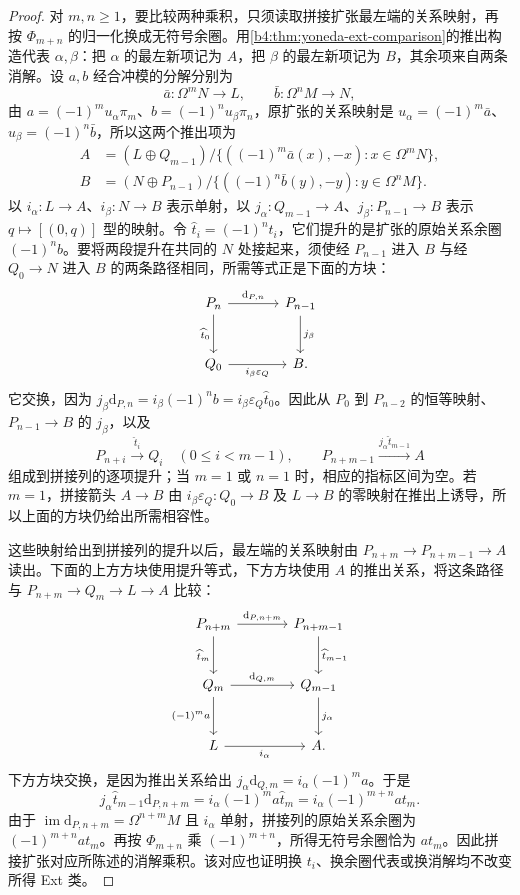 \begin{proof}
	对 \(m,n\ge1\)，要比较两种乘积，只须读取拼接扩张最左端的关系映射，再按 \(\Phi_{m+n}\) 的归一化换成无符号余圈。用\cref{b4:thm:yoneda-ext-comparison}的推出构造代表 \(\alpha,\beta\)：把 \(\alpha\) 的最左新项记为 \(A\)，把 \(\beta\) 的最左新项记为 \(B\)，其余项来自两条消解。设 \(a,b\) 经合冲模的分解分别为
	\[
		\bar a:\Omega^mN\to L,\qquad \bar b:\Omega^nM\to N,
	\]
	由 \(a=(-1)^mu_\alpha\pi_m\)、\(b=(-1)^nu_\beta\pi_n\)，原扩张的关系映射是 \(u_\alpha=(-1)^m\bar a\)、\(u_\beta=(-1)^n\bar b\)，所以这两个推出项为
	\[
		\begin{aligned}
			A&=(L\oplus Q_{m-1})/\{((-1)^m\bar a(x),-x):x\in\Omega^mN\},\\
			B&=(N\oplus P_{n-1})/\{((-1)^n\bar b(y),-y):y\in\Omega^nM\}.
		\end{aligned}
	\]
	以 \(i_\alpha:L\to A\)、\(i_\beta:N\to B\) 表示单射，以 \(j_\alpha:Q_{m-1}\to A\)、\(j_\beta:P_{n-1}\to B\) 表示 \(q\mapsto[(0,q)]\) 型的映射。令 \(\widehat t_i=(-1)^nt_i\)，它们提升的是扩张的原始关系余圈 \((-1)^nb\)。要将两段提升在共同的 \(N\) 处接起来，须使经 \(P_{n-1}\) 进入 \(B\) 与经 \(Q_0\to N\) 进入 \(B\) 的两条路径相同，所需等式正是下面的方块：
	\[
		\begin{tikzcd}[column sep=large,row sep=large]
			P_n \ar[r,"\mathrm{d}_{P,n}"] \ar[d,"\widehat t_0"'] & P_{n-1} \ar[d,"j_\beta"] \\
			Q_0 \ar[r,"i_\beta\varepsilon_Q"'] & B.
		\end{tikzcd}
	\]
	它交换，因为 \(j_\beta\mathrm{d}_{P,n}=i_\beta(-1)^nb=i_\beta\varepsilon_Q\widehat t_0\)。因此从 \(P_0\) 到 \(P_{n-2}\) 的恒等映射、\(P_{n-1}\to B\) 的 \(j_\beta\)，以及
	\[
		P_{n+i}\xrightarrow{\widehat t_i}Q_i\quad(0\le i<m-1),\qquad P_{n+m-1}\xrightarrow{j_\alpha\widehat t_{m-1}}A
	\]
	组成到拼接列的逐项提升；当 \(m=1\) 或 \(n=1\) 时，相应的指标区间为空。若 \(m=1\)，拼接箭头 \(A\to B\) 由 \(i_\beta\varepsilon_Q:Q_0\to B\) 及 \(L\to B\) 的零映射在推出上诱导，所以上面的方块仍给出所需相容性。

	这些映射给出到拼接列的提升以后，最左端的关系映射由 \(P_{n+m}\to P_{n+m-1}\to A\) 读出。下面的上方方块使用提升等式，下方方块使用 \(A\) 的推出关系，将这条路径与 \(P_{n+m}\to Q_m\to L\to A\) 比较：
	\[
		\begin{tikzcd}[column sep=large,row sep=large]
			P_{n+m} \ar[r,"\mathrm{d}_{P,n+m}"] \ar[d,"\widehat t_m"'] & P_{n+m-1} \ar[d,"\widehat t_{m-1}"] \\
			Q_m \ar[r,"\mathrm{d}_{Q,m}"] \ar[d,"(-1)^ma"'] & Q_{m-1} \ar[d,"j_\alpha"] \\
			L \ar[r,"i_\alpha"'] & A.
		\end{tikzcd}
	\]
	下方方块交换，是因为推出关系给出 \(j_\alpha\mathrm{d}_{Q,m}=i_\alpha(-1)^ma\)。于是
	\[
		j_\alpha\widehat t_{m-1}\mathrm{d}_{P,n+m} =i_\alpha(-1)^ma\widehat t_m =i_\alpha(-1)^{m+n}at_m.
	\]
	由于 \(\operatorname{im}\mathrm{d}_{P,n+m}=\Omega^{n+m}M\) 且 \(i_\alpha\) 单射，拼接列的原始关系余圈为 \((-1)^{m+n}at_m\)。再按 \(\Phi_{m+n}\) 乘 \((-1)^{m+n}\)，所得无符号余圈恰为 \(at_m\)。因此拼接扩张对应所陈述的消解乘积。该对应也证明换 \(t_i\)、换余圈代表或换消解均不改变所得 Ext 类。


\end{proof}
